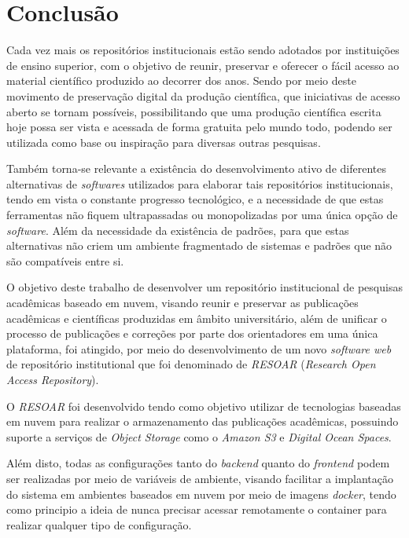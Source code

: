 \chapter*{Conclusão} \label{chap:concl}

Cada vez mais os repositórios institucionais estão sendo adotados por instituições de
ensino superior, com o objetivo de reunir, preservar e oferecer o fácil acesso ao material
científico produzido ao decorrer dos anos. Sendo por meio deste movimento de preservação
digital da produção científica, que iniciativas de acesso aberto se tornam possíveis,
possibilitando que uma produção científica escrita hoje possa ser vista e acessada
de forma gratuita pelo mundo todo, podendo ser utilizada como base ou inspiração para
diversas outras pesquisas.

Também torna-se relevante a existência do desenvolvimento ativo de diferentes
alternativas de \emph{softwares} utilizados para elaborar tais repositórios
institucionais, tendo em vista o constante progresso tecnológico, e a necessidade
de que estas ferramentas não fiquem ultrapassadas ou monopolizadas por uma única
opção de \emph{software}. Além da necessidade da existência de padrões, para que
estas alternativas não criem um ambiente fragmentado de sistemas e padrões que não
são compatíveis entre si.

O objetivo deste trabalho de desenvolver um repositório institucional de pesquisas
acadêmicas baseado em nuvem, visando reunir e preservar as publicações acadêmicas
e científicas produzidas em âmbito universitário, além de unificar o processo
de publicações e correções por parte dos orientadores em uma única plataforma,
foi atingido, por meio do desenvolvimento de um novo \emph{software web} de
repositório institutional que foi denominado de \emph{RESOAR}
(\emph{Research Open Access Repository}).

O \emph{RESOAR} foi desenvolvido tendo como objetivo utilizar de tecnologias baseadas
em nuvem para realizar o armazenamento das publicações acadêmicas, possuindo suporte
a serviços de \emph{Object Storage} como o \emph{Amazon S3} e \emph{Digital Ocean Spaces}.

Além disto, todas as configurações tanto do \emph{backend} quanto do \emph{frontend}
podem ser realizadas por meio de variáveis de ambiente, visando facilitar a implantação
do sistema em ambientes baseados em nuvem por meio de imagens \emph{docker}, tendo como
principio a ideia de nunca precisar acessar remotamente o container para realizar qualquer
tipo de configuração.

